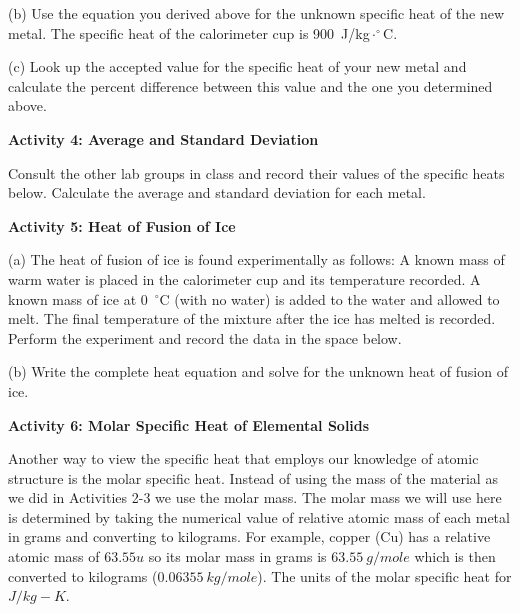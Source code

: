 (b) Use the equation you derived above for the unknown specific
heat of the new metal. 
The specific heat of the calorimeter cup is 900~J/kg$\cdot^{\circ}$C.

\answerspace{2.5cm}

(c) Look up the accepted value for the specific heat of your new metal and
calculate the percent difference between this value and the one you
determined above. 
\answerspace{25mm}

\pagebreak[3]
\textbf{Activity 4: Average and Standard Deviation}

Consult the other lab groups in class and record their values of the specific
heats below.
Calculate the average and standard deviation for each metal.
\answerspace{1.2in}


\textbf{Activity 5: Heat of Fusion of Ice}

(a) The heat of fusion of ice is found experimentally as follows:
A known mass of warm water is placed in the calorimeter cup and its
temperature recorded. A known mass of ice at 0~$^{\circ}$C (with
no water) is added to the water and allowed to melt. The final temperature
of the mixture after the ice has melted is recorded. Perform the experiment
and record the data in the space below.

\answerspace{20mm}

(b) Write the complete heat equation and solve for the unknown heat
of fusion of ice.
\answerspace{25mm}

\textbf{Activity 6: Molar Specific Heat of Elemental Solids}

Another way to view the specific heat that employs our knowledge of atomic structure
is the molar specific heat. 
Instead of using the mass of the material as we did in Activities 2-3 we use the molar mass.
The molar mass we will use here is determined by taking the numerical value of relative atomic mass 
of each metal in grams and converting to kilograms. 
For example, copper (Cu) has a relative atomic mass of $63.55 u$ so its molar mass in grams
is $63.55~g/mole$ which is then converted to kilograms ($0.06355~kg/mole$).
The units of the molar specific heat for $J/kg-K$.

